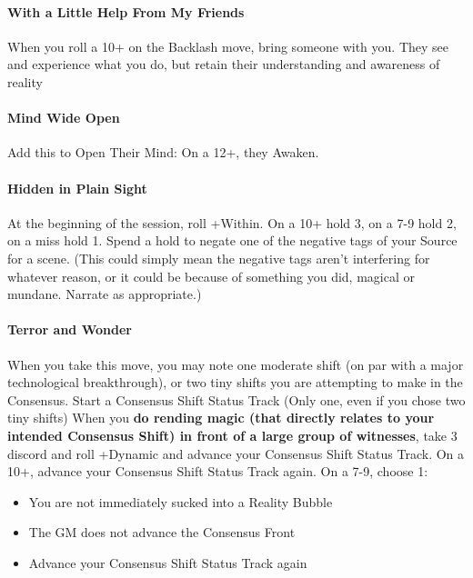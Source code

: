 \documentclass[10pt,twoside,openright]{memoir}
\begin{document}
\hypertarget{with-a-little-help-from-my-friends}{%
\paragraph{With a Little Help From My
Friends}\label{with-a-little-help-from-my-friends}}

When you roll a 10+ on the Backlash move, bring someone with you. They
see and experience what you do, but retain their understanding and
awareness of reality

\hypertarget{mind-wide-open}{%
\paragraph{Mind Wide Open}\label{mind-wide-open}}

Add this to Open Their Mind: On a 12+, they Awaken.

\hypertarget{hidden-in-plain-sight}{%
\paragraph{Hidden in Plain Sight}\label{hidden-in-plain-sight}}

At the beginning of the session, roll +Within. On a 10+ hold 3, on a 7-9
hold 2, on a miss hold 1. Spend a hold to negate one of the negative
tags of your Source for a scene. (This could simply mean the negative
tags aren't interfering for whatever reason, or it could be because of
something you did, magical or mundane. Narrate as appropriate.)

\hypertarget{terror-and-wonder}{%
\paragraph{Terror and Wonder}\label{terror-and-wonder}}

When you take this move, you may note one moderate shift (on par with a
major technological breakthrough), or two tiny shifts you are attempting
to make in the Consensus. Start a Consensus Shift Status Track (Only
one, even if you chose two tiny shifts) When you \textbf{do rending
magic (that directly relates to your intended Consensus Shift) in front
of a large group of witnesses}, take 3 discord and roll +Dynamic and
advance your Consensus Shift Status Track. On a 10+, advance your
Consensus Shift Status Track again. On a 7-9, choose 1:

\begin{itemize}
\item
  You are not immediately sucked into a Reality Bubble
\item
  The GM does not advance the Consensus Front
\item
  Advance your Consensus Shift Status Track again
\end{itemize}
\end{document}

